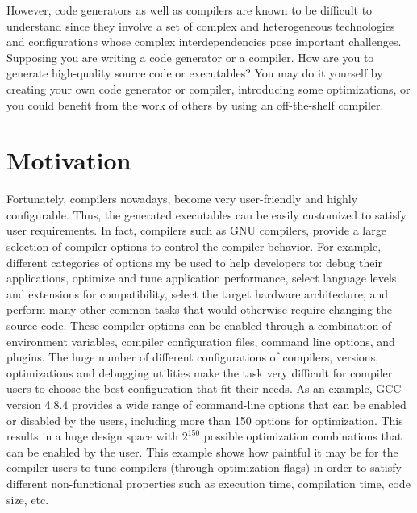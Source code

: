 However, code generators as well as compilers are known to be difficult to understand since they involve a set of complex and heterogeneous technologies and configurations whose complex interdependencies pose important challenges. 
Supposing you are writing a code generator or a compiler. How are you to generate high-quality source code or executables? You may do it yourself by creating your own code generator or compiler, introducing some optimizations, or you could benefit from the work of others by using an off-the-shelf compiler.


\section{Motivation}

Fortunately, compilers nowadays, become very user-friendly and highly configurable\cite{fursin2008milepost}. Thus, the generated executables can be easily customized to satisfy user requirements. In fact, compilers such as GNU compilers, provide a large selection of compiler options to control the compiler behavior. For example, different categories of options my be used to help developers to: debug their applications, optimize and tune application performance, select language levels and extensions for compatibility, select the target hardware architecture, and perform many other common tasks that would otherwise require changing the source code.
These compiler options can be enabled through a combination of environment variables, compiler configuration files, command line options, and plugins. 
The huge number of different configurations of compilers, versions, optimizations and debugging utilities make the task very difficult for compiler users to choose the best configuration that fit their needs. As an example, GCC version 4.8.4 provides a wide range of command-line options that can be enabled or disabled by the users, including more than 150 options for optimization. This results in a huge design space with $2^{150}$ possible optimization combinations that can be enabled by the user.
This example shows how paintful it may be for the compiler users to tune compilers (through optimization flags) in order to satisfy different non-functional properties such as execution time, compilation time, code size, etc.

